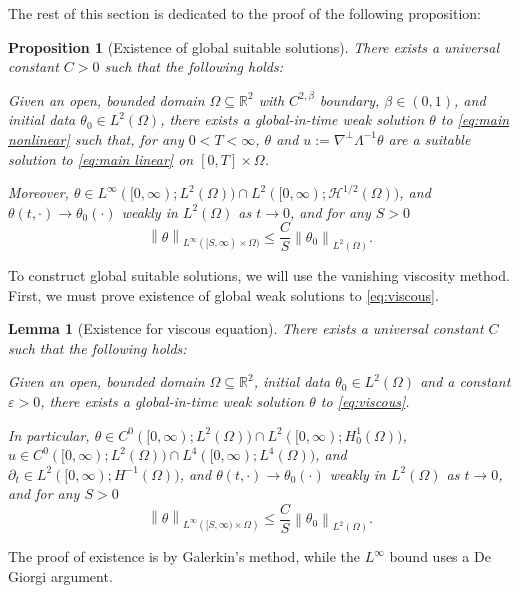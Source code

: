 \documentclass[11pt]{amsart}
\newtheorem{proposition}[theorem]{Proposition}
\newtheorem{lemma}[theorem]{Lemma}
\theoremstyle{remark}
\theoremstyle{definition}
\newcommand{\R}{\mathbb{R}}
\newcommand{\eps}{\varepsilon}
\newcommand{\norm}[1]{\left\lVert#1\right\rVert}
\newcommand{\paren}[1]{\left( #1 \right)}
\newcommand{\del}{\partial}
\newcommand{\grad}{\nabla}
\newcommand{\HD}{\mathcal{H}}
\begin{document}

The rest of this section is dedicated to the proof of the following proposition:

\begin{proposition}[Existence of global suitable solutions] \label{thm:existence}
There exists a universal constant $C > 0$ such that the following holds:

Given an open, bounded domain $\Omega \subseteq \R^2$ with $C^{2,\beta}$ boundary, $\beta \in (0,1)$, and initial data $\theta_0 \in L^2(\Omega)$, there exists a global-in-time weak solution $\theta$ to \eqref{eq:main nonlinear} such that, for any $0 < T < \infty$, $\theta$ and $u := \grad^\perp \Lambda^{-1} \theta$ are a suitable solution to \eqref{eq:main linear} on $[0,T] \times \Omega$.  

Moreover, $\theta \in L^\infty([0,\infty);L^2(\Omega)) \cap L^2([0,\infty);\HD^{1/2}(\Omega))$, and $\theta(t,\cdot) \to \theta_0(\cdot)$ weakly in $L^2(\Omega)$ as $t \to 0$, and for any $S > 0$
\[ \norm{\theta}_{L^\infty([S,\infty)\times\Omega)} \leq \frac{C}{S} \norm{\theta_0}_{L^2(\Omega)}. \]
\end{proposition}

To construct global suitable solutions, we will use the vanishing viscosity method.  First, we must prove existence of global weak solutions to \eqref{eq:viscous}.  

\begin{lemma}[Existence for viscous equation] \label{thm:viscous}
There exists a universal constant $C$ such that the following holds:

Given an open, bounded domain $\Omega \subseteq \R^2$, initial data $\theta_0 \in L^2(\Omega)$ and a constant $\eps > 0$, there exists a global-in-time weak solution $\theta$ to \eqref{eq:viscous}.  

In particular, $\theta \in C^0([0,\infty);L^2(\Omega)) \cap L^2([0,\infty);H_0^1(\Omega))$, $u \in C^0([0,\infty);L^2(\Omega)) \cap L^4([0,\infty);L^4(\Omega))$, and $\del_t \in L^2([0,\infty);H^{-1}(\Omega))$, and $\theta(t,\cdot) \to \theta_0(\cdot)$ weakly in $L^2(\Omega)$ as $t \to 0$, and for any $S > 0$
\[ \norm{\theta}_{L^\infty\paren{[S,\infty)\times\Omega}} \leq \frac{C}{S} \norm{\theta_0}_{L^2(\Omega)}. \]
\end{lemma}
The proof of existence is by Galerkin's method, while the $L^\infty$ bound uses a De Giorgi argument.  
\end{document}
